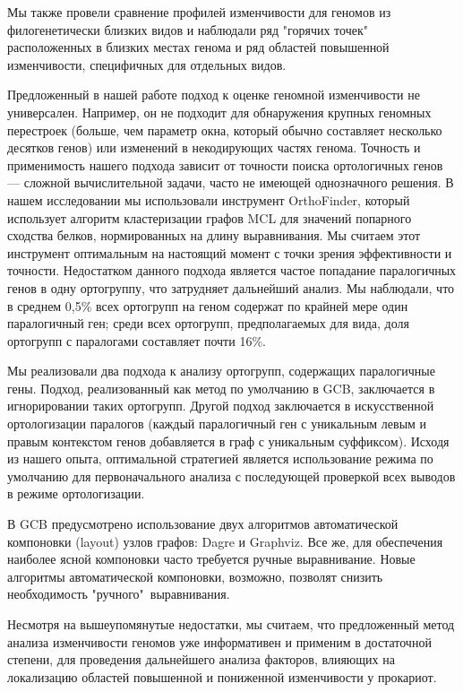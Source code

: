 Мы также провели сравнение профилей изменчивости для геномов из филогенетически близких видов и наблюдали ряд "горячих точек"\, расположенных в близких местах генома и ряд областей повышенной изменчивости, специфичных для отдельных видов. 

Предложенный в нашей работе подход к оценке геномной изменчивости не универсален. Например, он не подходит для обнаружения крупных геномных перестроек (больше, чем параметр окна, который обычно составляет несколько десятков генов) или изменений в некодирующих частях генома. Точность и применимость нашего подхода зависит от точности поиска ортологичных генов --- сложной вычислительной задачи, часто не имеющей однозначного решения. В нашем исследовании мы использовали инструмент OrthoFinder, который использует алгоритм кластеризации графов MCL для значений попарного сходства белков, нормированных на длину выравнивания. Мы считаем этот инструмент оптимальным на настоящий момент с точки зрения эффективности и точности. Недостатком данного подхода является частое попадание паралогичных генов в одну ортогруппу, что затрудняет дальнейший анализ. Мы наблюдали, что в среднем 0,5\% всех ортогрупп на геном содержат по крайней мере один паралогичный ген; среди всех ортогрупп, предполагаемых для вида, доля ортогрупп с паралогами составляет почти 16\%. 

Мы реализовали два подхода к анализу ортогрупп, содержащих паралогичные гены. Подход, реализованный как метод по умолчанию в GCB, заключается в игнорировании таких ортогрупп. Другой подход заключается в искусственной ортологизации паралогов (каждый паралогичный ген с уникальным левым и правым контекстом генов добавляется в граф с уникальным суффиксом). Исходя из нашего опыта, оптимальной стратегией является использование режима по умолчанию для первоначального анализа с последующей проверкой всех выводов в режиме ортологизации. 

В GCB предусмотрено использование двух алгоритмов автоматической компоновки (layout) узлов графов: Dagre и Graphviz. Все же, для обеспечения наиболее ясной компоновки часто требуется ручные выравнивание. Новые алгоритмы автоматической компоновки, возможно, позволят снизить необходимость "ручного"\ выравнивания.

Несмотря на вышеупомянутые недостатки, мы считаем, что предложенный метод анализа изменчивости геномов уже информативен и применим в достаточной степени, для проведения дальнейшего анализа факторов, влияющих на локализацию областей повышенной и пониженной изменчивости у прокариот.

